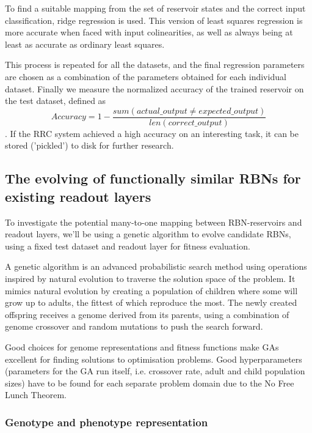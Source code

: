 To find a suitable mapping from the set of reservoir states and the correct input classification,
ridge regression \cite{hoerl1970ridge} is used.
This version of least squares regression is more accurate when faced with input colinearities,
as well as always being at least as accurate as ordinary least squares.

This process is repeated for all the datasets,
and the final regression parameters are chosen as a combination of the parameters obtained for each individual dataset.
Finally we measure the normalized accuracy of the trained reservoir on the test dataset,
defined as
\begin{equation}
Accuracy = 1 - \dfrac{sum(actual\_output \neq expected\_output)}{len(correct\_output)}
\label{formula:accuracy}
\end{equation}
.
If the RRC system achieved a high accuracy on an interesting task,
it can be stored ('pickled') to disk for further research.

\subsection{The evolving of functionally similar RBNs for existing readout layers}

To investigate the potential many-to-one mapping between RBN-reservoirs and readout layers,
we'll be using a genetic algorithm to evolve candidate RBNs,
using a fixed test dataset and readout layer for fitness evaluation.

A genetic algorithm is an advanced probabilistic search method using operations inspired by natural evolution to traverse the solution space of the problem.
It mimics natural evolution by creating a population of children where some will grow up to adults,
the fittest of which reproduce the most.
The newly created offspring receives a genome derived from its parents,
using a combination of genome crossover and random mutations to push the search forward.

Good choices for genome representations and fitness functions make GAs excellent for finding solutions to optimisation problems.
Good hyperparameters (parameters for the GA run itself, i.e. crossover rate, adult and child population sizes)
have to be found for each separate problem domain due to the No Free Lunch Theorem.

\subsubsection{Genotype and phenotype representation}

